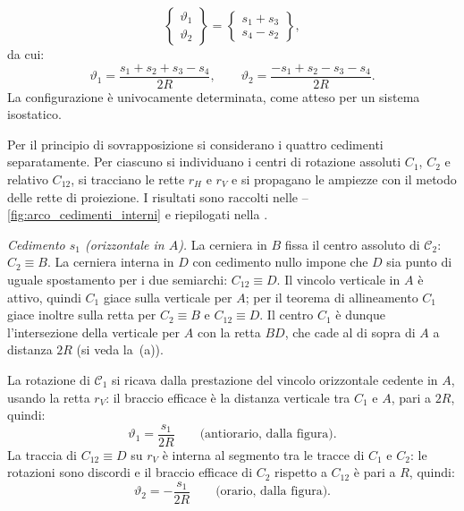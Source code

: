 \begin{esempio}
\begin{svolgimento}
\begin{equation*}
\begin{Bmatrix}
				\vartheta_1 \\ \vartheta_2
			\end{Bmatrix}
			=
			\begin{Bmatrix}
				s_1 + s_3 \\ s_4 - s_2
			\end{Bmatrix},
		\end{equation*}
		da cui:
		\begin{equation*}\label{eq:arco_rotazioni}
			\vartheta_1 = \frac{s_1 + s_2 + s_3 - s_4}{2R},
			\qquad
			\vartheta_2 = \frac{-s_1 + s_2 - s_3 - s_4}{2R}.
		\end{equation*}
		La configurazione è univocamente determinata, come atteso
		per un sistema isostatico.
		
		\noindent	{}
		Per il principio di sovrapposizione si considerano i	quattro cedimenti separatamente. Per ciascuno si individuano i centri di rotazione assoluti $C_1$, $C_2$	e relativo $C_{12}$, si tracciano le rette $r_H$ e $r_V$ e si propagano le ampiezze con il metodo delle rette di	proiezione. I risultati sono raccolti nelle	--\ref{fig:arco_cedimenti_interni} e	riepilogati nella	.
		
		



		
		\smallskip
		\noindent\textit{Cedimento $s_1$ (orizzontale in $A$).}
		La cerniera in $B$ fissa il centro assoluto di
		$\mathcal{C}_2$: $C_2 \equiv B$. La cerniera interna in
		$D$ con cedimento nullo impone che $D$ sia punto di uguale
		spostamento per i due semiarchi: $C_{12} \equiv D$.
		Il vincolo verticale in $A$ è attivo, quindi $C_1$ giace
		sulla verticale per $A$; per il teorema di allineamento
		$C_1$ giace inoltre sulla retta per $C_2 \equiv B$ e
		$C_{12} \equiv D$. Il centro $C_1$ è dunque
		l'intersezione della verticale per $A$ con la retta
		$BD$, che cade al di sopra di $A$ a distanza $2R$
		(si veda la \,(a)). 	
		
		La rotazione di $\mathcal{C}_1$ si ricava dalla
		prestazione del vincolo orizzontale cedente in $A$,
		usando la retta $r_V$: il braccio efficace è la distanza
		verticale tra $C_1$ e $A$, pari a $2R$, quindi:
		\begin{equation*}
			\vartheta_1 = \frac{s_1}{2R} \qquad
			\text{(antiorario, dalla figura)}.
		\end{equation*}
		La traccia di $C_{12} \equiv D$ su $r_V$ è interna al
		segmento tra le tracce di $C_1$ e $C_2$: le rotazioni
		sono discordi e il braccio efficace di $C_2$ rispetto
		a $C_{12}$ è pari a $R$, quindi:
		\begin{equation*}
			\vartheta_2 = -\frac{s_1}{2R} \qquad
			\text{(orario, dalla figura)}.
		\end{equation*}
		

\end{svolgimento}
\end{esempio}

